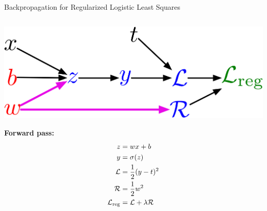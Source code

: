 \documentclass[handout,aspectratio=169]{beamer}
\begin{document}
\begin{frame}{Backpropagation for Regularized Logistic Least Squares}
  \begin{columns}
    \begin{column}{0.35 \linewidth}
      \includegraphics[width=\linewidth]{pics/reg_computation_graph.png}

      {\bf Forward pass:}
        \begin{align*}
          z &= w x + b \\
          y &= \sigma(z) \\
          {\cal L} &= \frac{1}{2} (y - t)^2 \\
          \mathcal{R} &= \frac{1}{2} w^2 \\
          {\cal L}_{\rm reg} &= {\cal L} + \lambda \mathcal{R}
        \end{align*}


\end{column}
\end{columns}
\end{frame}
\end{document}
